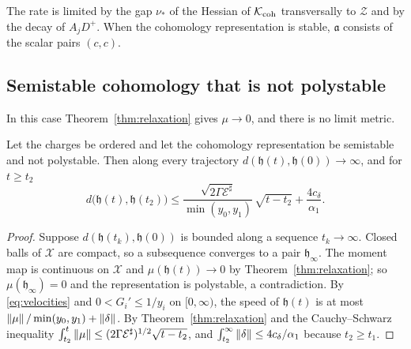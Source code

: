 \begin{remark}\label{rem:rate}
The rate is limited by the gap $\nu_*$ of the Hessian of $\mathcal K_{\mathrm{coh}}$
transversally to $\mathcal Z$ and by the decay of $A_jD^+$. When the
cohomology representation is stable, $\mathfrak a$ consists of the scalar
pairs $(c,c)$.
\end{remark}

\subsection{Semistable cohomology that is not polystable}
In this case Theorem~\ref{thm:relaxation} gives $\mu\to0$, and there is no
limit metric.

\begin{proposition}\label{prop:divergence}
Let the charges be ordered and let the cohomology representation be
semistable and not polystable. Then along every trajectory
$d(\mathfrak h(t),\mathfrak h(0))\to\infty$, and for $t\geq t_2$
\[
 d\bigl(\mathfrak h(t),\mathfrak h(t_2)\bigr)
 \leq\frac{\sqrt{2\Gamma\mathcal E^\sharp}}{\min(y_0,y_1)}\,\sqrt{t-t_2}
 +\frac{4c_\delta}{\alpha_1}.
\]
\end{proposition}

\begin{proof}
Suppose $d(\mathfrak h(t_k),\mathfrak h(0))$ is bounded along a sequence
$t_k\to\infty$. Closed balls of $\mathcal X$ are compact, so a subsequence
converges to a pair $\mathfrak h_\infty$. The moment map is continuous on
$\mathcal X$ and $\mu(\mathfrak h(t))\to0$ by
Theorem~\ref{thm:relaxation}; so $\mu(\mathfrak h_\infty)=0$ and the
representation is polystable, a contradiction. By \eqref{eq:velocities} and
$0<G_i'\leq1/y_i$ on $[0,\infty)$, the speed of $\mathfrak h(t)$ is at most
$\left\lVert\mu\right\rVert/\min(y_0,y_1)+\left\lVert\delta\right\rVert$. By Theorem~\ref{thm:relaxation} and the
Cauchy--Schwarz inequality
$\int_{t_2}^t\left\lVert\mu\right\rVert\leq(2\Gamma\mathcal E^\sharp)^{1/2}\sqrt{t-t_2}$, and
$\int_{t_2}^\infty\left\lVert\delta\right\rVert\leq4c_\delta/\alpha_1$ because $t_2\geq t_1$.
\end{proof}

